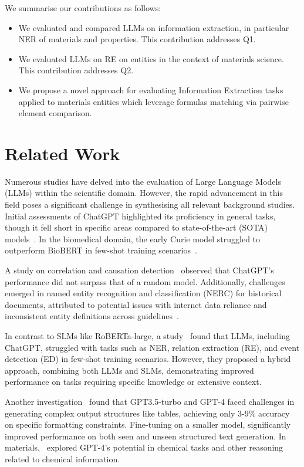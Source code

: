 \documentclass[a4paper]{article}
\begin{document}
We summarise our contributions as follows: 

\begin{itemize}
    \item We evaluated and compared LLMs on information extraction, in particular NER of materials and properties. This contribution addresses Q1. 
    \item We evaluated LLMs on RE on entities in the context of materials science. This contribution addresses Q2.
    \item We propose a novel approach for evaluating Information Extraction tasks applied to materials entities which leverage formulas matching via pairwise element comparison.
\end{itemize}


\section{Related Work}

Numerous studies have delved into the evaluation of Large Language Models (LLMs) within the scientific domain. However, the rapid advancement in this field poses a significant challenge in synthesising all relevant background studies. Initial assessments of ChatGPT highlighted its proficiency in general tasks, though it fell short in specific areas compared to state-of-the-art (SOTA) models~\cite{kokon2023chatgpt}. In the biomedical domain, the early Curie model struggled to outperform BioBERT in few-shot training scenarios~\cite{moradi2022gpt3}.

A study on correlation and causation detection~\cite{jin2023large} observed that ChatGPT's performance did not surpass that of a random model. Additionally, challenges emerged in named entity recognition and classification (NERC) for historical documents, attributed to potential issues with internet data reliance and inconsistent entity definitions across guidelines~\cite{gonzalez2023yes}.

In contrast to SLMs like RoBERTa-large, a study~\cite{ma2023large} found that LLMs, including ChatGPT, struggled with tasks such as NER, relation extraction (RE), and event detection (ED) in few-shot training scenarios. However, they proposed a hybrid approach, combining both LLMs and SLMs, demonstrating improved performance on tasks requiring specific knowledge or extensive context.

Another investigation~\cite{tang2023struc} found that GPT3.5-turbo and GPT-4 faced challenges in generating complex output structures like tables, achieving only 3-9\% accuracy on specific formatting constraints. Fine-tuning on a smaller model, significantly improved performance on both seen and unseen structured text generation.
In materials,~\cite{hatakeyama2023prompt} explored GPT-4’s potential in chemical tasks and other reasoning related to chemical information.
\end{document}
